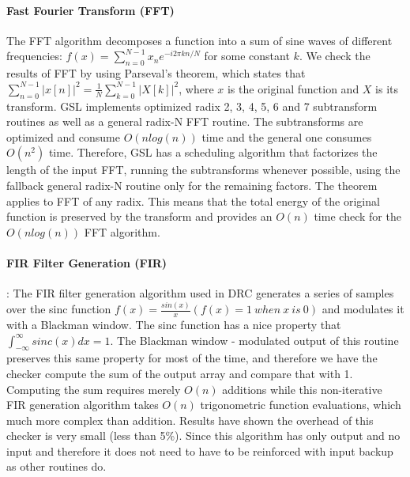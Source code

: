 \documentclass{sig-alternate}
\begin{document}
\paragraph{Fast Fourier Transform (FFT)}
The FFT algorithm decomposes a function into a sum of sine waves of different frequencies: $f(x) = \sum_{n=0}^{N-1} x_n e^{-i2\pi k n / N}$ for some constant $k$.
We check the results of FFT by using Parseval's theorem, which states that $\sum_{n=0}^{N-1} \left| x[n] \right|^2 = \frac{1}{N} \sum_{k=0}^{N-1} \left| X[k] \right|^2$, where $x$ is the original function and $X$ is its transform. GSL implements optimized radix 2, 3, 4, 5, 6 and 7 subtransform routines as well as a general radix-N FFT routine. The subtransforms are optimized and consume $O(n log(n))$ time and the general one consumes $O(n^2)$ time. Therefore, GSL has a scheduling algorithm that factorizes the length of the input FFT, running the subtransforms whenever possible, using the fallback general radix-N routine only for the remaining factors.
The theorem applies to FFT of any radix.
This means that the total energy of the original function is preserved by the transform and provides an $O(n)$ time check for the $O(n log(n))$ FFT algorithm.

\paragraph{FIR Filter Generation (FIR)}:
The FIR filter generation algorithm used in DRC generates a series of samples over the sinc function $f(x)=\frac{sin(x)}{x} (f(x)=1\ when\ x\ is\ 0)$ and modulates it with a Blackman window.
The sinc function has a nice property that $\int_{-\infty}^{\infty} sinc(x)dx = 1$. The Blackman window - modulated output of this routine
preserves this same property for most of the time, and therefore we have the checker compute the sum of the output array and compare that with 1.
Computing the sum requires merely $O(n)$ additions while this non-iterative FIR generation algorithm takes $O(n)$ trigonometric function evaluations, which much more complex than addition. Results have shown
the overhead of this checker is very small (less than 5\%).
Since this algorithm has only output and no input and therefore it does not need to have to be reinforced with input backup as other routines do.
\end{document}
